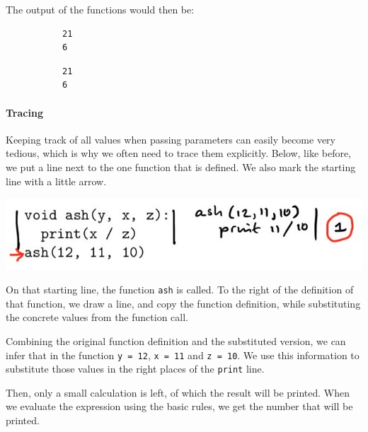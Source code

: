 The output of the functions would then be:

\begin{figure}[h]
\begin{subfigure}[b]{.5\linewidth}
\begin{verbatim}
21
6
\end{verbatim}
\end{subfigure}
\begin{subfigure}[b]{.5\linewidth}
\begin{verbatim}
21
6
\end{verbatim}
\end{subfigure}
\end{figure}

\paragraph{Tracing}

Keeping track of all values when passing parameters can easily become very tedious, which is why we often need to trace them explicitly. Below, like before, we put a line next to the one function that is defined. We also mark the starting line with a little arrow. 

\includegraphics[width=.8\textwidth]{2-trace-params.jpeg}

On that starting line, the function \texttt{ash} is called. To the right of the definition of that function, we draw a line, and copy the function definition, while substituting the concrete values from the function call.

Combining the original function definition and the substituted version, we can infer that in the function \texttt{y = 12}, \texttt{x = 11} and \texttt{z = 10}. We use this information to substitute those values in the right places of the \texttt{print} line.

Then, only a small calculation is left, of which the result will be printed. When we evaluate the expression using the basic rules, we get the number that will be printed.
